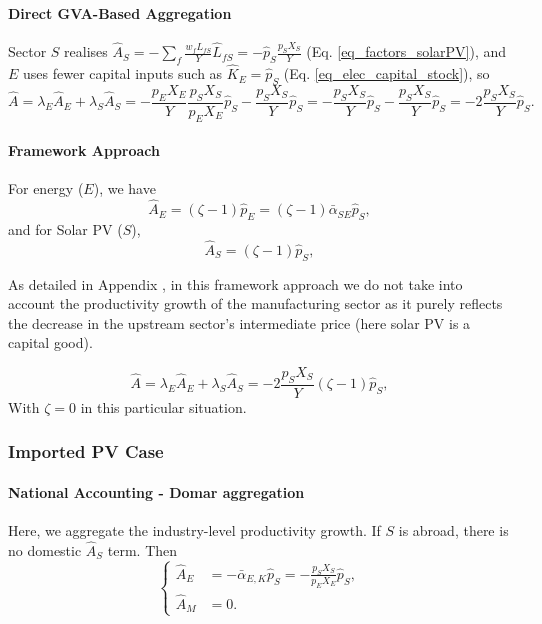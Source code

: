 \documentclass[11pt]{article}
\begin{document}
\paragraph{Direct GVA-Based Aggregation}

Sector $S$ realises $\hat{A}_S=-\sum_{f} \frac{w_fL_{fS}}{Y}\hat{L}_{fS}=-\hat{p}_S\frac{p_SX_S}{Y}$ (Eq. \ref{eq_factors_solarPV}), and $E$ uses fewer capital inputs such as $\hat{K}_E=\hat{p}_S$ (Eq. \ref{eq_elec_capital_stock}), so
\begin{equation}
    \hat{A} =\lambda_E\hat{A}_E+\lambda_S\hat{A}_S=-\frac{p_EX_E}{Y}\frac{p_SX_S}{p_EX_E}\hat{p}_S-\frac{p_SX_S}{Y} \hat{p}_{S}
    =
    -\frac{p_SX_S}{Y}\hat{p}_S-\frac{p_SX_S}{Y} \hat{p}_{S}=-2\frac{p_SX_S}{Y} \hat{p}_{S}.
\end{equation}

\paragraph{Framework Approach}
For energy ($E$), we have
\[
\hat{A}_E=(\zeta-1)\hat{p}_E=(\zeta-1)\bar{\alpha}_{SE}\hat{p}_S,
\]
and for Solar PV ($S$),
\[
\hat{A}_S=(\zeta-1)\hat{p}_S,
\]

As detailed in Appendix , in this framework approach we do not take into account the productivity growth of the manufacturing sector as it purely reflects the decrease in the upstream sector's intermediate price (here solar PV is a capital good).

\begin{equation*}
    \hat{A}=\lambda_E\hat{A}_E+\lambda_S\hat{A}_S=
-2\frac{p_SX_S}{Y}(\zeta-1)\hat{p}_S,
\end{equation*}
With $\zeta=0$ in this particular situation. 



\subsubsection{Imported PV Case}
\label{section_imported_PV}

\paragraph{National Accounting - Domar aggregation} Here, we aggregate the industry-level productivity growth. If $S$ is abroad, there is no domestic $\hat{A}_S$ term. Then
\begin{equation*}
    \begin{cases}
\hat{A}_E&=-\bar{\alpha}_{E,K}\hat{p}_S=-\frac{p_SX_S}{p_EX_E}\hat{p}_S,\\
\hat{A}_M&=0.
\end{cases}
\end{equation*}
\end{document}
